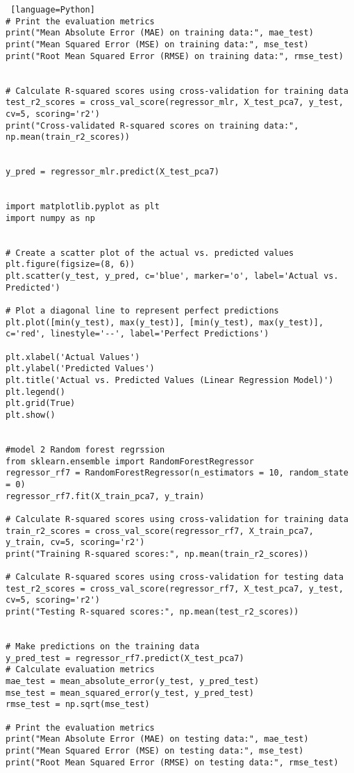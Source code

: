 \documentclass[12pt, a4paper,oneside]{book}
\numberwithin{equation}{section}
\begin{document}
\begin{lstlisting} [language=Python]
# Print the evaluation metrics
print("Mean Absolute Error (MAE) on training data:", mae_test)
print("Mean Squared Error (MSE) on training data:", mse_test)
print("Root Mean Squared Error (RMSE) on training data:", rmse_test)


# Calculate R-squared scores using cross-validation for training data
test_r2_scores = cross_val_score(regressor_mlr, X_test_pca7, y_test, cv=5, scoring='r2')
print("Cross-validated R-squared scores on training data:", np.mean(train_r2_scores))


y_pred = regressor_mlr.predict(X_test_pca7)


import matplotlib.pyplot as plt
import numpy as np


# Create a scatter plot of the actual vs. predicted values
plt.figure(figsize=(8, 6))
plt.scatter(y_test, y_pred, c='blue', marker='o', label='Actual vs. Predicted')

# Plot a diagonal line to represent perfect predictions
plt.plot([min(y_test), max(y_test)], [min(y_test), max(y_test)], c='red', linestyle='--', label='Perfect Predictions')

plt.xlabel('Actual Values')
plt.ylabel('Predicted Values')
plt.title('Actual vs. Predicted Values (Linear Regression Model)')
plt.legend()
plt.grid(True)
plt.show()


#model 2 Random forest regrssion
from sklearn.ensemble import RandomForestRegressor
regressor_rf7 = RandomForestRegressor(n_estimators = 10, random_state = 0)
regressor_rf7.fit(X_train_pca7, y_train)

# Calculate R-squared scores using cross-validation for training data
train_r2_scores = cross_val_score(regressor_rf7, X_train_pca7, y_train, cv=5, scoring='r2')
print("Training R-squared scores:", np.mean(train_r2_scores))

# Calculate R-squared scores using cross-validation for testing data
test_r2_scores = cross_val_score(regressor_rf7, X_test_pca7, y_test, cv=5, scoring='r2')
print("Testing R-squared scores:", np.mean(test_r2_scores))


# Make predictions on the training data
y_pred_test = regressor_rf7.predict(X_test_pca7)
# Calculate evaluation metrics
mae_test = mean_absolute_error(y_test, y_pred_test)
mse_test = mean_squared_error(y_test, y_pred_test)
rmse_test = np.sqrt(mse_test)

# Print the evaluation metrics
print("Mean Absolute Error (MAE) on testing data:", mae_test)
print("Mean Squared Error (MSE) on testing data:", mse_test)
print("Root Mean Squared Error (RMSE) on testing data:", rmse_test)




\end{lstlisting}
\end{document}
